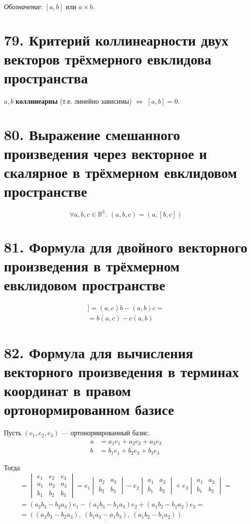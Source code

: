 \documentclass[a4paper, 12pt]{article}
\newcommand{\R}{\mathbb{R}}
\begin{document}
\textit{Обозначение}: $[a, b]$ или $a \times b$.

\section*{79. Критерий коллинеарности двух векторов трёхмерного евклидова пространства}
$a, b$ \textbf{коллинеарны} (т.е. линейно зависимы) $\Longleftrightarrow$ $[a, b] = 0$.

\section*{80. Выражение смешанного произведения через векторное и скалярное в трёхмерном евклидовом пространстве}
\[
\forall a, b, c \in \R^3:\ (a, b, c) = (a, [b, c])
\]

\section*{81. Формула для двойного векторного произведения в трёхмерном евклидовом пространстве}
\vspace{-7mm}
\begin{align*}
[a, [b, c]] = (a, c)b - (a, b)c = \\
              = b(a, c) - c(a, b)
\end{align*}

\section*{82. Формула для вычисления векторного произведения в терминах координат в правом ортонормированном базисе}
Пусть $(e_1, e_2, e_3)$ --- ортонормированный базис.
\vspace{-2mm}
\begin{align*}
a &= a_1e_1 + a_2e_2 + a_3e_3 \\
b &= b_1e_1 + b_2e_2 + b_3e_3
\end{align*}

\vspace{-2mm}
Тогда
\vspace{-2mm}
\begin{align*}
[a,\ b] =
\begin{vmatrix}
e_1 & e_2 & e_3 \\
a_1 & a_2 & a_3 \\
b_1 & b_2 & b_3
\end{vmatrix} =
e_1
\begin{vmatrix}
a_2 & a_3 \\
b_2 & b_3
\end{vmatrix}
- e_2
\begin{vmatrix}
a_1 & a_3 \\
b_1 & b_3
\end{vmatrix}
+ e_3
\begin{vmatrix}
a_1 & a_2 \\
b_1 & b_2
\end{vmatrix} = \\
= (a_2b_3 - b_2a_3)e_1 - (a_1b_3 - b_1a_3)e_2 + (a_1b_2 - b_1a_2)e_3 = \\
= \underline{((a_2b_3 - b_2a_3),\ (b_1a_3 - a_1b_3),\ (a_1b_2 - b_1a_2))}
\end{align*}
\end{document}
